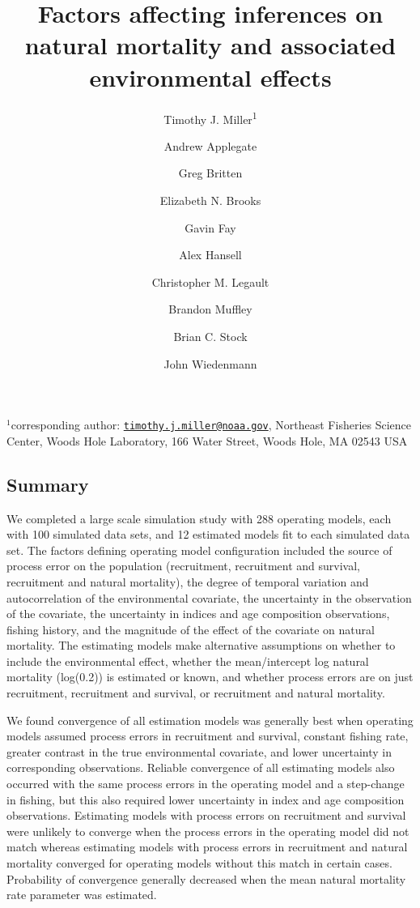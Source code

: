 \documentclass[
  12pt,
]{article}
\title{Factors affecting inferences on natural mortality and associated
environmental effects}
\author{Timothy J. Miller\textsuperscript{1} \and Andrew
Applegate \and Greg Britten \and Elizabeth N. Brooks \and Gavin
Fay \and Alex Hansell \and Christopher M. Legault \and Brandon
Muffley \and Brian C. Stock \and John Wiedenmann}
\date{}
\begin{document}
\maketitle

\(^1\)corresponding author:
\href{mailto:timothy.j.miller@noaa.gov}{\nolinkurl{timothy.j.miller@noaa.gov}},
Northeast Fisheries Science Center, Woods Hole Laboratory, 166 Water
Street, Woods Hole, MA 02543 USA\\

\pagebreak

\hypertarget{summary}{%
\subsection*{Summary}\label{summary}}

We completed a large scale simulation study with 288 operating models,
each with 100 simulated data sets, and 12 estimated models fit to each
simulated data set. The factors defining operating model configuration
included the source of process error on the population (recruitment,
recruitment and survival, recruitment and natural mortality), the degree
of temporal variation and autocorrelation of the environmental
covariate, the uncertainty in the observation of the covariate, the
uncertainty in indices and age composition observations, fishing
history, and the magnitude of the effect of the covariate on natural
mortality. The estimating models make alternative assumptions on whether
to include the environmental effect, whether the mean/intercept log
natural mortality (log(0.2)) is estimated or known, and whether process
errors are on just recruitment, recruitment and survival, or recruitment
and natural mortality.

We found convergence of all estimation models was generally best when
operating models assumed process errors in recruitment and survival,
constant fishing rate, greater contrast in the true environmental
covariate, and lower uncertainty in corresponding observations. Reliable
convergence of all estimating models also occurred with the same process
errors in the operating model and a step-change in fishing, but this
also required lower uncertainty in index and age composition
observations. Estimating models with process errors on recruitment and
survival were unlikely to converge when the process errors in the
operating model did not match whereas estimating models with process
errors in recruitment and natural mortality converged for operating
models without this match in certain cases. Probability of convergence
generally decreased when the mean natural mortality rate parameter was
estimated.
\end{document}
